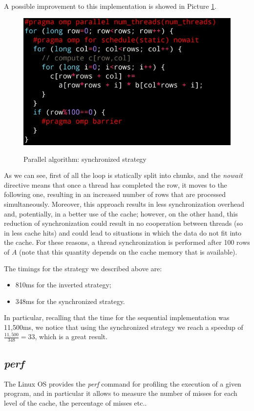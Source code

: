 A possible improvement to this implementation is showed in Picture \ref{par5}.

\begin{figure}[h!]
		\centering
		\includegraphics[scale = 1.6]{img/par5.jpg}
        \label{par5}
        \caption{Parallel algorithm: synchronized strategy}
\end{figure}

As we can see, first of all the loop is statically split into chunks, and the \textit{nowait} directive means that once a thread has completed the row, it moves to the following one, resulting in an increased number of rows that are processed simultaneously. Moreover, this approach results in less synchronization overhead and, potentially, in a better use of the cache; however, on the other hand, this reduction of synchronization could result in no cooperation between threads (so in less cache hits) and could lead to situations in which the data do not fit into the cache. For these reasons, a thread synchronization is performed after 100 rows of $A$ (note that this quantity depends on the cache memory that is available).

The timings for the strategy we described above are:

\begin{itemize}
    \item 810ms for the inverted strategy;
    \item 348ms for the synchronized strategy.
\end{itemize}

In particular, recalling that the time for the sequential implementation was 11,500ms, we notice that using the synchronized strategy we reach a speedup of $\frac{11,500}{348} = 33$, which is a great result.

\subsection{\textit{perf}}
The Linux OS provides the \textit{perf} command for profiling the execution of a given program, and in particular it allows to measure the number of misses for each level of the cache, the percentage of misses etc..

